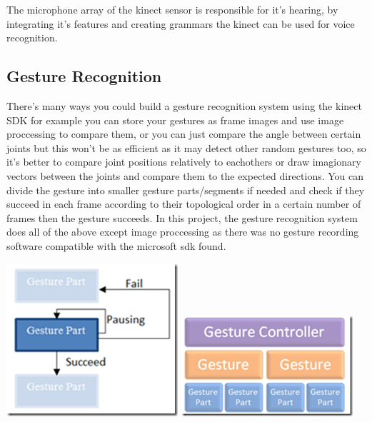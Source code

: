 The microphone array of the kinect sensor is responsible for it's hearing, by integrating it's features and creating grammars the kinect can be used for voice recognition.

\subsection{Gesture Recognition}

There's many ways you could build a gesture recognition system using the kinect SDK for example you can store your gestures as frame images and use image proccessing to compare them, or you can just compare the angle between certain joints but this won't be as efficient as it may detect other random gestures too, so it's better to compare joint positions relatively to eachothers or draw imagionary vectors between the joints and compare them to the expected directions. 
You can divide the gesture into smaller gesture parts/segments if needed and check if they succeed in each frame according to their topological order in a certain number of frames then the gesture succeeds.
In this project, the gesture recognition system does all of the above except image proccessing as there was no gesture recording software compatible with the microsoft sdk found.

\includegraphics[width=1.0\linewidth]{GestureArchitecture1.png}
\includegraphics[width=1.0\linewidth]{GestureArchitecture2.png}

